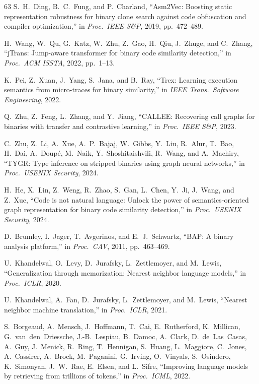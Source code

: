 \documentclass[sigconf,nonacm]{acmart}
\begin{document}
{\begin{thebibliography}{63}
S.~H.~Ding, B.~C.~Fung, and P.~Charland, ``Asm2Vec: Boosting static representation robustness for binary clone search against code obfuscation and compiler optimization,'' in \emph{Proc.\ IEEE S\&P}, 2019, pp.~472--489.

H.~Wang, W.~Qu, G.~Katz, W.~Zhu, Z.~Gao, H.~Qiu, J.~Zhuge, and C.~Zhang, ``jTrans: Jump-aware transformer for binary code similarity detection,'' in \emph{Proc.\ ACM ISSTA}, 2022, pp.~1--13.

K.~Pei, Z.~Xuan, J.~Yang, S.~Jana, and B.~Ray, ``Trex: Learning execution semantics from micro-traces for binary similarity,'' in \emph{IEEE Trans.\ Software Engineering}, 2022.

Q.~Zhu, Z.~Feng, L.~Zhang, and Y.~Jiang, ``CALLEE: Recovering call graphs for binaries with transfer and contrastive learning,'' in \emph{Proc.\ IEEE S\&P}, 2023.

C.~Zhu, Z.~Li, A.~Xue, A.~P.~Bajaj, W.~Gibbs, Y.~Liu, R.~Alur, T.~Bao, H.~Dai, A.~Doup\'{e}, M.~Naik, Y.~Shoshitaishvili, R.~Wang, and A.~Machiry, ``TYGR: Type inference on stripped binaries using graph neural networks,'' in \emph{Proc.\ USENIX Security}, 2024.

H.~He, X.~Lin, Z.~Weng, R.~Zhao, S.~Gan, L.~Chen, Y.~Ji, J.~Wang, and Z.~Xue, ``Code is not natural language: Unlock the power of semantics-oriented graph representation for binary code similarity detection,'' in \emph{Proc.\ USENIX Security}, 2024.

D.~Brumley, I.~Jager, T.~Avgerinos, and E.~J.~Schwartz, ``BAP: A binary analysis platform,'' in \emph{Proc.\ CAV}, 2011, pp.~463--469.

U.~Khandelwal, O.~Levy, D.~Jurafsky, L.~Zettlemoyer, and M.~Lewis, ``Generalization through memorization: Nearest neighbor language models,'' in \emph{Proc.\ ICLR}, 2020.

U.~Khandelwal, A.~Fan, D.~Jurafsky, L.~Zettlemoyer, and M.~Lewis, ``Nearest neighbor machine translation,'' in \emph{Proc.\ ICLR}, 2021.

S.~Borgeaud, A.~Mensch, J.~Hoffmann, T.~Cai, E.~Rutherford, K.~Millican, G.~van~den~Driessche, J.-B.~Lespiau, B.~Damoc, A.~Clark, D.~de~Las~Casas, A.~Guy, J.~Menick, R.~Ring, T.~Hennigan, S.~Huang, L.~Maggiore, C.~Jones, A.~Cassirer, A.~Brock, M.~Paganini, G.~Irving, O.~Vinyals, S.~Osindero, K.~Simonyan, J.~W.~Rae, E.~Elsen, and L.~Sifre, ``Improving language models by retrieving from trillions of tokens,'' in \emph{Proc.\ ICML}, 2022.


\end{thebibliography}}
\end{document}
